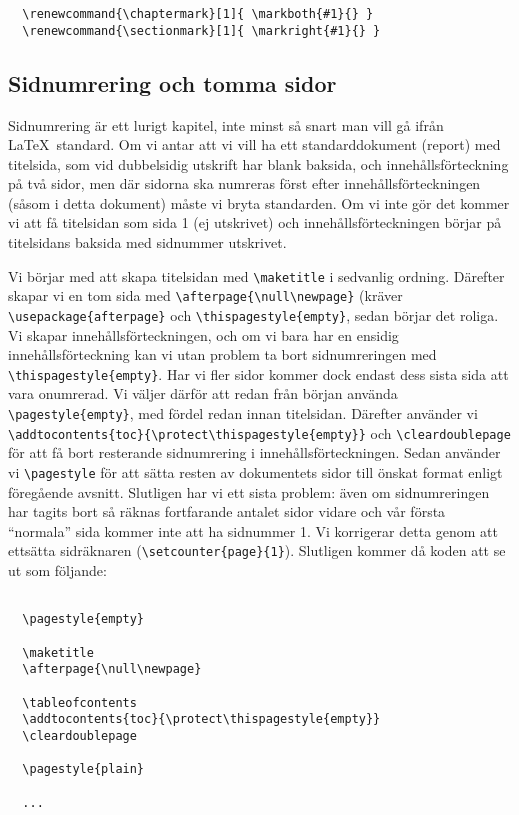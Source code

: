 \begin{verbatim}
  \renewcommand{\chaptermark}[1]{ \markboth{#1}{} }
  \renewcommand{\sectionmark}[1]{ \markright{#1}{} }
\end{verbatim}

\subsection{Sidnumrering och tomma sidor}
Sidnumrering är ett lurigt kapitel, inte minst så snart man vill gå ifrån \LaTeX\ standard. Om vi antar att vi vill ha ett standarddokument (report) med titelsida, som vid dubbelsidig utskrift har blank baksida, och innehållsförteckning på två sidor, men där sidorna ska numreras först efter innehållsförteckningen (såsom i detta dokument) måste vi bryta standarden. Om vi inte gör det kommer vi att få titelsidan som sida 1 (ej utskrivet) och innehållsförteckningen börjar på titelsidans baksida med sidnummer utskrivet.

Vi börjar med att skapa titelsidan med \verb+\maketitle+ i sedvanlig ordning. Därefter skapar vi en tom sida med \verb+\afterpage{\null\newpage}+ (kräver \verb+\usepackage{afterpage}+ och \verb+\thispagestyle{empty}+, sedan börjar det roliga. Vi skapar innehållsförteckningen, och om vi bara har en ensidig innehållsförteckning kan vi utan problem ta bort sidnumreringen med \verb+\thispagestyle{empty}+. Har vi fler sidor kommer dock endast dess sista sida att vara onumrerad. Vi väljer därför att redan från början använda \verb+\pagestyle{empty}+, med fördel redan innan titelsidan. Därefter använder vi \verb+\addtocontents{toc}{\protect\thispagestyle{empty}}+ och \verb+\cleardoublepage+ för att få bort resterande sidnumrering i innehållsförteckningen. Sedan använder vi \verb+\pagestyle+ för att sätta resten av dokumentets sidor till önskat format enligt föregående avsnitt. Slutligen har vi ett sista problem: även om sidnumreringen har tagits bort så räknas fortfarande antalet sidor vidare och vår första ``normala'' sida kommer inte att ha sidnummer 1. Vi korrigerar detta genom att ettsätta sidräknaren (\verb+\setcounter{page}{1}+). Slutligen kommer då koden att se ut som följande:

\begin{verbatim}

  \pagestyle{empty}

  \maketitle
  \afterpage{\null\newpage}

  \tableofcontents
  \addtocontents{toc}{\protect\thispagestyle{empty}}
  \cleardoublepage

  \pagestyle{plain}

  ...


\end{verbatim}
\pagestyle{plain} %
